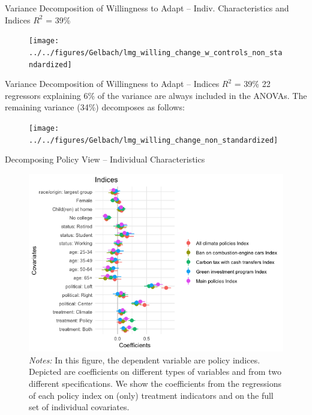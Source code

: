 \begin{frame}{Variance Decomposition of Willingness to Adapt -- Indiv. Characteristics and Indices}%
\vspace{-.15cm}
{\footnotesize $R^2$ = 39\%}
\begin{figure}[h!]
\vspace{-.15cm}
\texttt{[image: ../../figures/Gelbach/lmg\_willing\_change\_w\_controls\_non\_standardized]} \\
\end{figure}
\end{frame}

\begin{frame}{Variance Decomposition of Willingness to Adapt -- Indices}%
\vspace{-.1cm}
{\footnotesize $R^2$ = 39\% 22 regressors explaining 6\% of the variance are always included in the ANOVAs. The remaining variance (34\%) decomposes as follows:}
\begin{figure}[h!]
\vspace{-.1cm}
\texttt{[image: ../../figures/Gelbach/lmg\_willing\_change\_non\_standardized]} \\
\end{figure}
\end{frame}



\begin{frame}{Decomposing Policy View -- Individual Characteristics}%
\begin{figure}[h!]
\includegraphics[width=.75\textwidth]{../../figures/Gelbach/coef_policy_views_all} \\
{\tiny \textit{Notes:} In this figure, the dependent variable are policy indices. Depicted are coefficients on different types of variables and from two different specifications. We show the coefficients from the regressions of each policy index on (only) treatment indicators and on the full set of individual covariates.}
\end{figure}
\end{frame}

